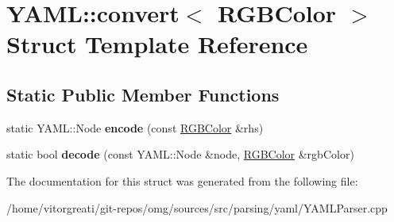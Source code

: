 \hypertarget{struct_y_a_m_l_1_1convert_3_01_r_g_b_color_01_4}{}\section{Y\+A\+ML\+::convert$<$ R\+G\+B\+Color $>$ Struct Template Reference}
\label{struct_y_a_m_l_1_1convert_3_01_r_g_b_color_01_4}
\subsection*{Static Public Member Functions}
\begin{DoxyCompactItemize}
\item 
\mbox{\label{struct_y_a_m_l_1_1convert_3_01_r_g_b_color_01_4_a53435107a4d117741eb69f1e4b837f1d}} 
static Y\+A\+M\+L\+::\+Node {\bfseries encode} (const \mbox{\hyperlink{namespaceomg_a92d9bbc48ad35def2aa4b0ac3a5b22ae}{R\+G\+B\+Color}} \&rhs)
\item 
\mbox{\label{struct_y_a_m_l_1_1convert_3_01_r_g_b_color_01_4_a8696a3dc0862f142d82656eff201284a}} 
static bool {\bfseries decode} (const Y\+A\+M\+L\+::\+Node \&node, \mbox{\hyperlink{namespaceomg_a92d9bbc48ad35def2aa4b0ac3a5b22ae}{R\+G\+B\+Color}} \&rgb\+Color)
\end{DoxyCompactItemize}


The documentation for this struct was generated from the following file\+:\begin{DoxyCompactItemize}
\item 
/home/vitorgreati/git-\/repos/omg/sources/src/parsing/yaml/Y\+A\+M\+L\+Parser.\+cpp\end{DoxyCompactItemize}
